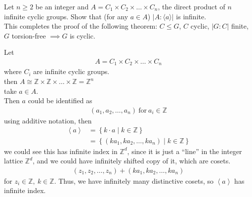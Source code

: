 \documentclass{article}
\begin{document}
\pagebreak

\begin{homeworkProblem}
Let $n \geq 2$ be an integer and $A = C_1 \times C_2 \times \ldots \times C_n$,
the direct product of $n$ infinite cyclic groups.
Show that (for any $a \in A$) $\lvert A : \langle a \rangle \rvert$ is infinite.\\
This completes the proof of the following theorem: $C \leq G$,
$C$ cyclic, $\lvert G: C \rvert$ finite, $G$ torsion-free $\implies G$ is cyclic.\\
\solution

Let 
\begin{align}
    A = C_1 \times C_2 \times \ldots \times C_n
\end{align}
where $C_i$ are infinite cyclic groups.\\
then $A \cong \mathbb{Z} \times \mathbb{Z} \times \ldots \times \mathbb{Z} = \mathbb{Z}^n$\\
take $a \in A$.\\
Then $a$ could be identified as 
\begin{align}
    (a_1, a_2, \ldots, a_n) \ \text{for} \ a_i \in \mathbb{Z}
\end{align}
using additive notation, then
\begin{align}
    \left\langle a \right\rangle &= \left\{ k \cdot a \mid k \in \mathbb{Z} \right\}\\
    &= \left\{ (k a_1, k a_2, \ldots, k a_n ) \mid k \in \mathbb{Z} \right\}
\end{align}
we could see this has infinite index in $\mathbb{Z}^d$, since 
it is just a ``line'' in the integer lattice $\mathbb{Z}^d$,
and we could have infinitely shifted copy of it, 
which are cosets.
\begin{align}
    (z_1, z_2, \ldots, z_n) + (k a_1, k a_2, \ldots, k a_n) 
\end{align}
for $z_i \in \mathbb{Z}, \ k \in \mathbb{Z}$.
Thus, we have infinitely many distinctive cosets, 
so $\left\langle a \right\rangle$ has infinite index.






    
\end{homeworkProblem}
\end{document}
